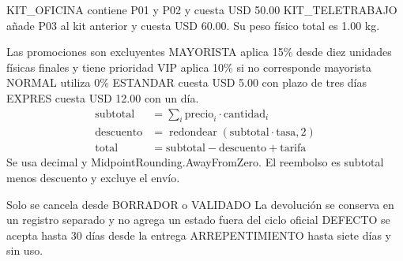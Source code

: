 KIT\_OFICINA contiene P01 y P02 y cuesta USD 50.00 KIT\_TELETRABAJO añade P03 al kit anterior y cuesta USD 60.00. Su peso físico total es 1.00 kg.

Las promociones son excluyentes MAYORISTA aplica 15\% desde diez unidades físicas finales y tiene prioridad VIP aplica 10\% si no corresponde mayorista NORMAL utiliza 0\% ESTANDAR cuesta USD 5.00 con plazo de tres días EXPRES cuesta USD 12.00 con un día.
\begin{align*}
\text{subtotal} &= \sum_i \text{precio}_i\cdot\text{cantidad}_i\\
\text{descuento} &= \operatorname{redondear}(\text{subtotal}\cdot\text{tasa},2)\\
\text{total} &= \text{subtotal}-\text{descuento}+\text{tarifa}
\end{align*}
Se usa decimal y MidpointRounding.AwayFromZero. El reembolso es subtotal menos descuento y excluye el envío.

Solo se cancela desde BORRADOR o VALIDADO La devolución se conserva en un registro separado y no agrega un estado fuera del ciclo oficial DEFECTO se acepta hasta 30 días desde la entrega ARREPENTIMIENTO hasta siete días y sin uso.
\FloatBarrier
